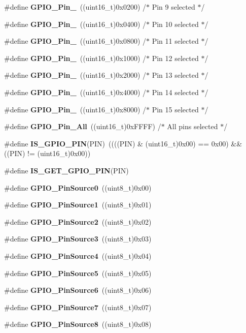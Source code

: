 \begin{DoxyCompactItemize}
\item 
\#define \textbf{ G\+P\+I\+O\+\_\+\+Pin\+\_}~((uint16\+\_\+t)0x0200)  /$\ast$ Pin 9 selected $\ast$/
\item 
\#define \textbf{ G\+P\+I\+O\+\_\+\+Pin\+\_}~((uint16\+\_\+t)0x0400)  /$\ast$ Pin 10 selected $\ast$/
\item 
\#define \textbf{ G\+P\+I\+O\+\_\+\+Pin\+\_}~((uint16\+\_\+t)0x0800)  /$\ast$ Pin 11 selected $\ast$/
\item 
\#define \textbf{ G\+P\+I\+O\+\_\+\+Pin\+\_}~((uint16\+\_\+t)0x1000)  /$\ast$ Pin 12 selected $\ast$/
\item 
\#define \textbf{ G\+P\+I\+O\+\_\+\+Pin\+\_}~((uint16\+\_\+t)0x2000)  /$\ast$ Pin 13 selected $\ast$/
\item 
\#define \textbf{ G\+P\+I\+O\+\_\+\+Pin\+\_}~((uint16\+\_\+t)0x4000)  /$\ast$ Pin 14 selected $\ast$/
\item 
\#define \textbf{ G\+P\+I\+O\+\_\+\+Pin\+\_}~((uint16\+\_\+t)0x8000)  /$\ast$ Pin 15 selected $\ast$/
\item 
\#define \textbf{ G\+P\+I\+O\+\_\+\+Pin\+\_\+\+All}~((uint16\+\_\+t)0x\+F\+F\+F\+F)  /$\ast$ All pins selected $\ast$/
\item 
\#define \textbf{ I\+S\+\_\+\+G\+P\+I\+O\+\_\+\+P\+IN}(P\+IN)~((((P\+IN) \& (uint16\+\_\+t)0x00) == 0x00) \&\& ((\+P\+I\+N) != (uint16\+\_\+t)0x00))
\item 
\#define \textbf{ I\+S\+\_\+\+G\+E\+T\+\_\+\+G\+P\+I\+O\+\_\+\+P\+IN}(P\+IN)
\item 
\#define \textbf{ G\+P\+I\+O\+\_\+\+Pin\+Source0}~((uint8\+\_\+t)0x00)
\item 
\#define \textbf{ G\+P\+I\+O\+\_\+\+Pin\+Source1}~((uint8\+\_\+t)0x01)
\item 
\#define \textbf{ G\+P\+I\+O\+\_\+\+Pin\+Source2}~((uint8\+\_\+t)0x02)
\item 
\#define \textbf{ G\+P\+I\+O\+\_\+\+Pin\+Source3}~((uint8\+\_\+t)0x03)
\item 
\#define \textbf{ G\+P\+I\+O\+\_\+\+Pin\+Source4}~((uint8\+\_\+t)0x04)
\item 
\#define \textbf{ G\+P\+I\+O\+\_\+\+Pin\+Source5}~((uint8\+\_\+t)0x05)
\item 
\#define \textbf{ G\+P\+I\+O\+\_\+\+Pin\+Source6}~((uint8\+\_\+t)0x06)
\item 
\#define \textbf{ G\+P\+I\+O\+\_\+\+Pin\+Source7}~((uint8\+\_\+t)0x07)
\item 
\#define \textbf{ G\+P\+I\+O\+\_\+\+Pin\+Source8}~((uint8\+\_\+t)0x08)

\end{DoxyCompactItemize}
